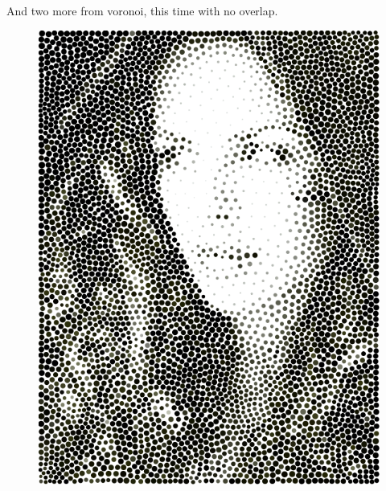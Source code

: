 \documentclass[11pt]{article}
\begin{document}
\begin{figure}[H]
\end{figure}

And two more from voronoi, this time with no overlap.

\begin{figure}[H]
\includegraphics[scale=0.4]{fairyeyes-noverlap-4k-color.png}

\end{figure}
\end{document}
